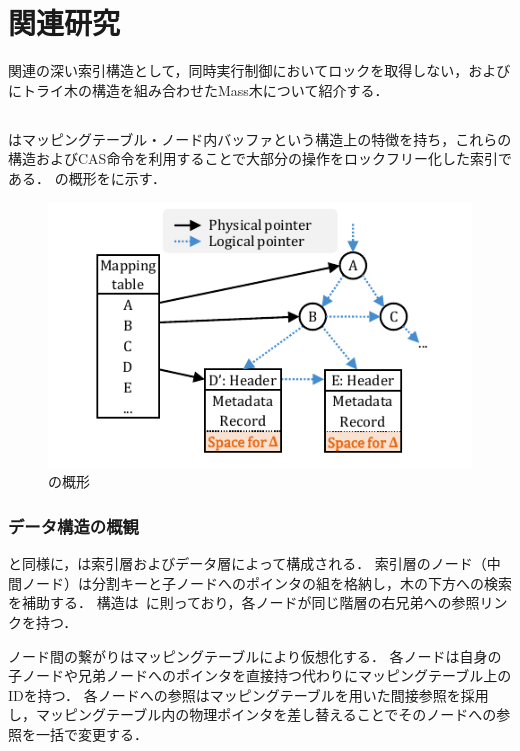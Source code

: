 \section{関連研究}
\label{sec:relatedwork}
関連の深い索引構造として，同時実行制御においてロックを取得しない\Bctree{}，および\Bptree{}にトライ木の構造を組み合わせたMass木について紹介する．

\subsection{\Bctree{}}
\Bctree{}はマッピングテーブル・ノード内バッファという構造上の特徴を持ち，これらの構造およびCAS命令を利用することで大部分の操作をロックフリー化した索引である．
\Bctree{}の概形を\Fig{\ref{fig:bc_tree-structure}}に示す．

\begin{figure}[t]
    \centering
    \includegraphics{./figures/Bc-structure.pdf}
    \caption{\Bctree{}の概形}
    \label{fig:bc_tree-structure}
\end{figure}

\subsubsection{データ構造の概観}
\Bptree{}と同様に，\Bctree{}は索引層およびデータ層によって構成される．
索引層のノード（中間ノード）は分割キーと子ノードへのポインタの組を格納し，木の下方への検索を補助する．
構造は\Blinktree{}~\cite{tods1981:Lehman}に則っており，各ノードが同じ階層の右兄弟への参照リンクを持つ．

ノード間の繋がりはマッピングテーブルにより仮想化する．
各ノードは自身の子ノードや兄弟ノードへのポインタを直接持つ代わりにマッピングテーブル上のIDを持つ．
各ノードへの参照はマッピングテーブルを用いた間接参照を採用し，マッピングテーブル内の物理ポインタを差し替えることでそのノードへの参照を一括で変更する．

